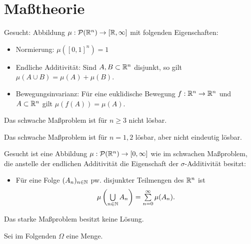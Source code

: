 \documentclass{cheat-sheet}
\newcommand{\PS}{\mathcal{P}} %
\begin{document}

\section{Maßtheorie}

\begin{prob}
  Gesucht: Abbildung $\mu : \PS(\R^n) \to [\R, \infty]$ mit folgenden Eigenschaften:
  \begin{itemize}
    \item Normierung: $\mu([0, 1]^n) = 1$
    \item Endliche Additivität: Sind $A, B \subset \mathbb{R}^n$ disjunkt, so gilt $\mu(A \cup B) = \mu(A) + \mu(B)$.
    \item Bewegungsinvarianz: Für eine euklidische Bewegung $f : \mathbb{R}^n \to \mathbb{R}^n$ und $A \subset \mathbb{R}^n$ gilt $\mu(f(A)) = \mu(A)$.
  \end{itemize}
\end{prob}

\begin{satz}[Hausdorff]
  Das schwache Maßproblem ist für $n \geq 3$ nicht lösbar.
\end{satz}

\begin{satz}[Banach]
  Das schwache Maßproblem ist für $n = 1, 2$ lösbar, aber nicht eindeutig lösbar.
\end{satz}

\begin{prob}
  Gesucht ist eine Abbildung $\mu : \PS(\R^n) \to [0, \infty]$ wie im schwachen Maßproblem, die anstelle der endlichen Additivität die Eigenschaft der $\sigma$-Additivität besitzt:
  \begin{itemize}
    \item Für eine Folge $(A_n)_{n \in \mathbb{N}}$ pw. disjunkter Teilmengen des $\mathbb{R}^n$ ist
      \[ \mu\left(\bigcup_{n \in \N} A_n\right) = \sum_{n=0}^\infty \mu(A_n). \]
  \end{itemize}
\end{prob}

\begin{satz}
  Das starke Maßproblem besitzt keine Lösung.
\end{satz}

\begin{nota}
  Sei im Folgenden $\Omega$ eine Menge.
\end{nota}
\end{document}
